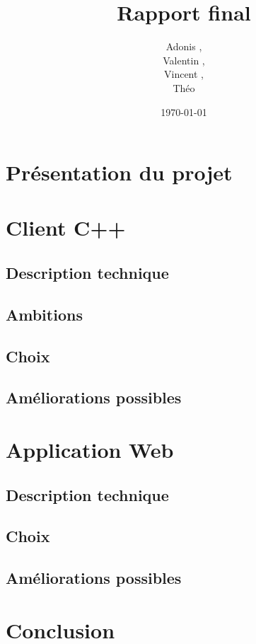 \documentclass[a4paper]{article}
\title{Rapport final}
\author{Adonis \bsc{Najimi},\\
 Valentin \bsc{Stern},\\
 Vincent \bsc{Albert},\\
 Théo \bsc{Gerriet}}
\date{\today}
\begin{document}
\maketitle
\newpage

\section{Présentation du projet}


\section{Client C++}
    \subsection{Description technique}
    

    \subsection{Ambitions}
    

    \subsection{Choix}
    
    
    \subsection{Améliorations possibles}
    

\newpage
\section{Application Web}
	\subsection{Description technique}
	
	\subsection{Choix}
	
	\subsection{Améliorations possibles}
	
	
\newpage
\section{Conclusion}

\newpage
\tableofcontents
\end{document}
